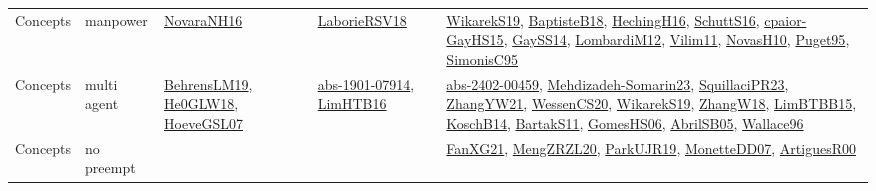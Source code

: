 {\begin{longtable}{lp{3cm}>{\raggedright}p{6cm}>{\raggedright}p{6cm}p{8cm}}
Concepts & manpower & \href{articles/NovaraNH16.pdf}{NovaraNH16}\cite{NovaraNH16} & \href{articles/LaborieRSV18.pdf}{LaborieRSV18}\cite{LaborieRSV18} & \href{articles/WikarekS19.pdf}{WikarekS19}\cite{WikarekS19}, \href{articles/BaptisteB18.pdf}{BaptisteB18}\cite{BaptisteB18}, \href{papers/HechingH16.pdf}{HechingH16}\cite{HechingH16}, \href{papers/SchuttS16.pdf}{SchuttS16}\cite{SchuttS16}, \href{papers/cpaior-GayHS15.pdf}{cpaior-GayHS15}\cite{cpaior-GayHS15}, \href{papers/GaySS14.pdf}{GaySS14}\cite{GaySS14}, \href{articles/LombardiM12.pdf}{LombardiM12}\cite{LombardiM12}, \href{papers/Vilim11.pdf}{Vilim11}\cite{Vilim11}, \href{articles/NovasH10.pdf}{NovasH10}\cite{NovasH10}, \href{papers/Puget95.pdf}{Puget95}\cite{Puget95}, \href{papers/SimonisC95.pdf}{SimonisC95}\cite{SimonisC95}\\
Concepts & multi agent & \href{papers/BehrensLM19.pdf}{BehrensLM19}\cite{BehrensLM19}, \href{papers/He0GLW18.pdf}{He0GLW18}\cite{He0GLW18}, \href{papers/HoeveGSL07.pdf}{HoeveGSL07}\cite{HoeveGSL07} & \href{articles/abs-1901-07914.pdf}{abs-1901-07914}\cite{abs-1901-07914}, \href{papers/LimHTB16.pdf}{LimHTB16}\cite{LimHTB16} & \href{articles/abs-2402-00459.pdf}{abs-2402-00459}\cite{abs-2402-00459}, \href{papers/Mehdizadeh-Somarin23.pdf}{Mehdizadeh-Somarin23}\cite{Mehdizadeh-Somarin23}, \href{papers/SquillaciPR23.pdf}{SquillaciPR23}\cite{SquillaciPR23}, \href{articles/ZhangYW21.pdf}{ZhangYW21}\cite{ZhangYW21}, \href{papers/WessenCS20.pdf}{WessenCS20}\cite{WessenCS20}, \href{articles/WikarekS19.pdf}{WikarekS19}\cite{WikarekS19}, \href{articles/ZhangW18.pdf}{ZhangW18}\cite{ZhangW18}, \href{papers/LimBTBB15.pdf}{LimBTBB15}\cite{LimBTBB15}, \href{papers/KoschB14.pdf}{KoschB14}\cite{KoschB14}, \href{articles/BartakS11.pdf}{BartakS11}\cite{BartakS11}, \href{papers/GomesHS06.pdf}{GomesHS06}\cite{GomesHS06}, \href{papers/AbrilSB05.pdf}{AbrilSB05}\cite{AbrilSB05}, \href{articles/Wallace96.pdf}{Wallace96}\cite{Wallace96}\\
Concepts & no preempt &  &  & \href{articles/FanXG21.pdf}{FanXG21}\cite{FanXG21}, \href{articles/MengZRZL20.pdf}{MengZRZL20}\cite{MengZRZL20}, \href{papers/ParkUJR19.pdf}{ParkUJR19}\cite{ParkUJR19}, \href{papers/MonetteDD07.pdf}{MonetteDD07}\cite{MonetteDD07}, \href{articles/ArtiguesR00.pdf}{ArtiguesR00}\cite{ArtiguesR00}\\

\end{longtable}}
